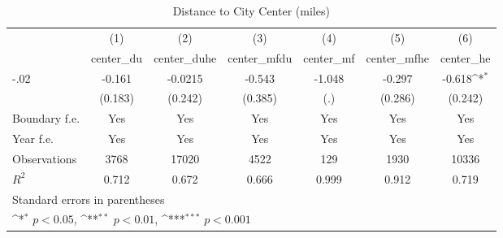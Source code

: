 \begin{table}[htbp]\centering
\def\sym#1{\ifmmode^{#1}\else\(^{#1}\)\fi}
\caption{Distance to City Center (miles)}
\begin{tabular}{l*{6}{c}}
\hline\hline
                    &\multicolumn{1}{c}{(1)}&\multicolumn{1}{c}{(2)}&\multicolumn{1}{c}{(3)}&\multicolumn{1}{c}{(4)}&\multicolumn{1}{c}{(5)}&\multicolumn{1}{c}{(6)}\\
                    &\multicolumn{1}{c}{center\_du}&\multicolumn{1}{c}{center\_duhe}&\multicolumn{1}{c}{center\_mfdu}&\multicolumn{1}{c}{center\_mf}&\multicolumn{1}{c}{center\_mfhe}&\multicolumn{1}{c}{center\_he}\\
\hline
-.02                &      -0.161         &     -0.0215         &      -0.543         &      -1.048         &      -0.297         &      -0.618\sym{*}  \\
                    &     (0.183)         &     (0.242)         &     (0.385)         &         (.)         &     (0.286)         &     (0.242)         \\
[1em]
Boundary f.e.       &         Yes         &         Yes         &         Yes         &         Yes         &         Yes         &         Yes         \\
[1em]
Year f.e.           &         Yes         &         Yes         &         Yes         &         Yes         &         Yes         &         Yes         \\
\hline
Observations        &        3768         &       17020         &        4522         &         129         &        1930         &       10336         \\
\(R^{2}\)           &       0.712         &       0.672         &       0.666         &       0.999         &       0.912         &       0.719         \\
\hline\hline
\multicolumn{7}{l}{\footnotesize Standard errors in parentheses}\\
\multicolumn{7}{l}{\footnotesize \sym{*} \(p<0.05\), \sym{**} \(p<0.01\), \sym{***} \(p<0.001\)}\\
\end{tabular}
\end{table}
